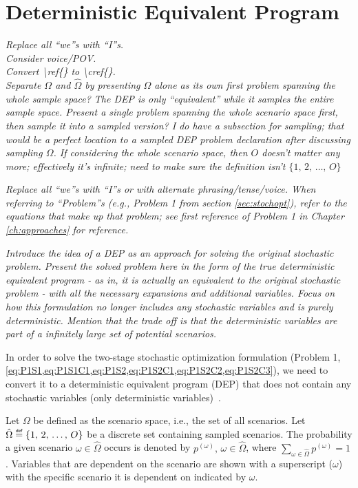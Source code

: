 \documentclass[12pt,dvipsnames]{report}
\newcommand\defeq{\mathrel{\overset{\makebox[0pt]{\mbox{\normalfont\tiny\sffamily def}}}{=}}}
\begin{document}
\section{Deterministic Equivalent Program} \label{sec:dep}

%
\textit{Replace all ``we''s with ``I''s.\\Consider voice/POV.\\Convert \textbackslash ref\{\} to \textbackslash cref\{\}.\\Separate $\Omega$ and $\hat{\Omega}$ by presenting $\Omega$ alone as its own first problem spanning the whole sample space?  The DEP is only ``equivalent'' while it samples the entire sample space.  Present a single problem spanning the whole scenario space first, then sample it into a sampled version?  I do have a subsection for sampling; that would be a perfect location to a sampled DEP problem declaration after discussing sampling $\Omega$.  If considering the whole scenario space, then $O$ doesn't matter any more; effectively it's infinite; need to make sure the definition isn't $\{1,\, 2,\, \dots,\, O\}$}

\textit{Replace all ``we''s with ``I''s or with alternate phrasing/tense/voice.  When referring to ``Problem''s (e.g., Problem 1 from section \ref{sec:stochopt}), refer to the equations that make up that problem; see first reference of Problem 1 in Chapter \ref{ch:approaches} for reference.}

\textit{Introduce the idea of a DEP as an approach for solving the original stochastic problem.  Present the solved problem here in the form of the true deterministic equivalent program - as in, it is actually an equivalent to the original stochastic problem - with all the necessary expansions and additional variables.  Focus on how this formulation no longer includes any stochastic variables and is purely deterministic.  Mention that the trade off is that the deterministic variables are part of a infinitely large set of potential scenarios.}

In order to solve the two-stage stochastic optimization formulation (Problem 1, \cref{eq:P1S1,eq:P1S1C1,eq:P1S2,eq:P1S2C1,eq:P1S2C2,eq:P1S2C3}), we need to convert it to a deterministic equivalent program (DEP) that does not contain any stochastic variables (only deterministic variables)~\cite{stochprogramming}.

Let $\Omega$ be defined as the scenario space, i.e., the set of all scenarios.  Let $\hat{\Omega} \defeq \{1,\, 2,\, \ldots,\, O\}$ be a discrete set containing sampled scenarios.  The probability a given scenario $\omega \in \hat{\Omega}$ occurs is denoted by $p^{(\omega)},\, \omega \in \hat{\Omega}$, where $\sum_{\omega \in \hat{\Omega}} p^{(\omega)} = 1$.  Variables that are dependent on the scenario are shown with a superscript ($\omega$) with the specific scenario it is dependent on indicated by $\omega$.
\end{document}
